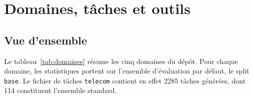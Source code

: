 \section{Domaines, tâches et outils}
\label{sec:domaines}

\subsection{Vue d'ensemble}

Le tableau~\ref{tab:domaines} résume les cinq domaines du dépôt. Pour chaque domaine, les statistiques portent sur l'ensemble d'évaluation par défaut, le split \texttt{base}. Le fichier de tâches \texttt{telecom} contient en effet 2285 tâches générées, dont 114 constituent l'ensemble standard.

\begin{table}[h]
  \centering\small
  \resizebox{\linewidth}{!}{}
  \caption{Statistiques des domaines (split \texttt{base}). R/W : nombre d'outils de lecture et d'écriture de l'agent. « Mots politique » : longueur de la politique fournie à l'agent. « Actions gold » : longueur de la trajectoire de référence. « Tâches sans écriture » : tâches dont la trajectoire de référence ne contient aucun outil d'écriture, de sorte que l'état final attendu de la base est l'état initial. Généré par \texttt{code/domain\_stats.py}.}
  \label{tab:domaines}
\end{table}

